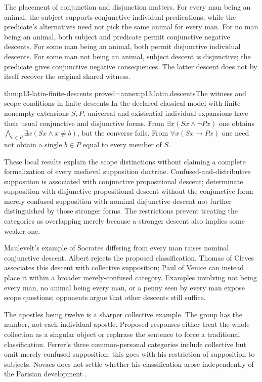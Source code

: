 The placement of conjunction and disjunction matters. For every man being
an animal, the subject supports conjunctive individual predications, while
the predicate's alternatives need not pick the same animal for every man.
For no man being an animal, both subject and predicate permit conjunctive
negative descents. For some man being an animal, both permit disjunctive
individual descents. For some man not being an animal, subject descent
is disjunctive; the predicate gives conjunctive negative consequences.
The latter descent does not by itself recover the original shared witness.

\begin{hblemma}{thm:p13-latin-finite-descents}
 {proved=annex:p13.latin.descents}{The witness and scope conditions in finite descents}
In the declared classical model with finite nonempty extensions \(S,P\),
universal and existential individual expansions have their usual conjunctive
and disjunctive forms. From \(\exists x(Sx\land\neg Px)\) one obtains
\(\bigwedge_{b\in P}\exists x(Sx\land x\ne b)\), but the converse fails.
From \(\forall x(Sx\to Px)\) one need not obtain a single \(b\in P\)
equal to every member of \(S\).
\end{hblemma}

These local results explain the scope distinctions without claiming a
complete formalization of every medieval supposition doctrine.
Confused-and-distributive supposition is associated with conjunctive
propositional descent; determinate supposition with disjunctive propositional
descent without the conjunctive form; merely confused supposition with
nominal disjunctive descent not further distinguished by those stronger forms.
The restrictions prevent treating the categories as overlapping merely
because a stronger descent also implies some weaker one.

Maulevelt's example of Socrates differing from every man raises nominal
conjunctive descent. Albert rejects the proposed classification.
Thomas of Cleves associates this descent with collective supposition;
Paul of Venice can instead place it within a broader merely-confused
category. Examples involving not being every man, no animal being every
man, or a penny seen by every man expose scope questions; opponents argue
that other descents still suffice.

The apostles being twelve is a sharper collective example. The group
has the number, not each individual apostle. Proposed responses either
treat the whole collection as a singular object or rephrase the sentence
to force a traditional classification. Ferrer's three common-personal
categories include collective but omit merely confused supposition;
this goes with his restriction of supposition to subjects.
Novaes does not settle whether his classification arose independently
of the Parisian development
\cite[pp.~452--457]{DutilhNovaes2007FordhamChapter8}.

